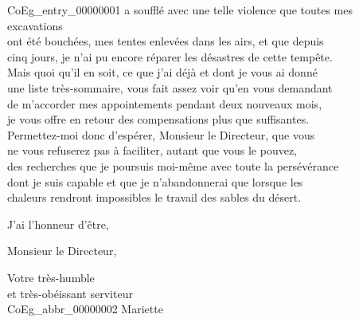 \documentclass{book}
\begin{document}
\Gls{CoEg_entry_00000001} a soufflé avec une telle violence que toutes mes excavations\\
ont été bouchées, mes tentes enlevées dans les airs, et que depuis\\
cinq jours, je n’ai pu encore réparer les désastres de cette tempête.\\
\indent Mais quoi qu’il en soit, ce que j’ai déjà et dont je vous ai donné\\
une liste très-sommaire, vous fait assez voir qu’en vous demandant\\
de m’accorder mes appointements pendant deux nouveaux mois,\\
je vous offre en retour des compensations plus que suffisantes.\\
\indent Permettez-moi donc d’espérer, Monsieur le Directeur, que vous\\
ne vous refuserez pas à faciliter, autant que vous le pouvez,\\
des recherches que je poursuis moi-même avec toute la persévérance\\
dont je suis capable et que je n’abandonnerai que lorsque les\\
chaleurs rendront impossibles le travail des sables du désert.
\par J’ai l’honneur d’être,
\begin{center} Monsieur le Directeur,\end{center}
\begin{center} \hspace{5cm}Votre très-humble\\
\hspace{5cm}et très-obéissant serviteur\\
\hspace{5cm} \gls{CoEg_abbr_00000002} Mariette\end{center}

\hypertarget{CoEg_Mariette_1851-08-31}{}
\end{document}
